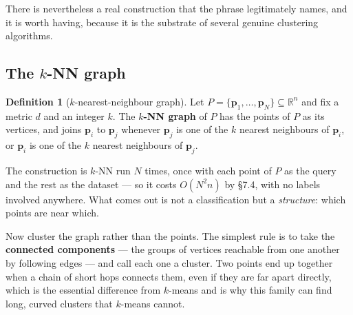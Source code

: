 \documentclass[11pt]{article}
\theoremstyle{plain}
\theoremstyle{definition}
\newtheorem{defn}{Definition}[section]
\theoremstyle{remark}
\newcommand{\R}{\mathbb{R}}
\newcommand{\vc}[1]{\mathbf{#1}}
\begin{document}
\noindent There is nevertheless a real construction that the phrase legitimately
names, and it is worth having, because it is the substrate of several genuine
clustering algorithms.

\subsection{The $k$-NN graph}
\begin{defn}[$k$-nearest-neighbour graph]
Let $P=\{\vc{p}_1,\dots,\vc{p}_N\}\subseteq\R^{n}$ and fix a metric $d$ and an
integer $k$. The \textbf{$k$-NN graph} of $P$ has the points of $P$ as its
vertices, and joins $\vc{p}_i$ to $\vc{p}_j$ whenever $\vc{p}_j$ is one of the
$k$ nearest neighbours of $\vc{p}_i$, or $\vc{p}_i$ is one of the $k$ nearest
neighbours of $\vc{p}_j$.
\end{defn}

\noindent The construction is $k$-NN run $N$ times, once with each point of $P$
as the query and the rest as the dataset --- so it costs $O(N^{2}n)$ by \S7.4,
with no labels involved anywhere. What comes out is not a classification but a
\emph{structure}: which points are near which.

Now cluster the graph rather than the points. The simplest rule is to take the
\textbf{connected components} --- the groups of vertices reachable from one
another by following edges --- and call each one a cluster. Two points end up
together when a chain of short hops connects them, even if they are far apart
directly, which is the essential difference from $k$-means and is why this
family can find long, curved clusters that $k$-means cannot.

\end{document}
